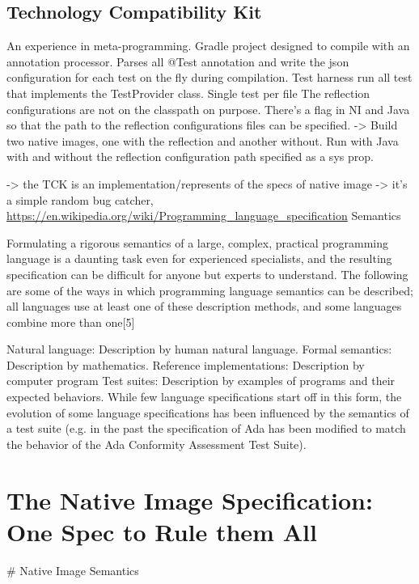 \section{Technology Compatibility Kit}
An experience in meta-programming. 
Gradle project designed to compile with an annotation processor. Parses all @Test annotation and write the json configuration for each test on the fly
during compilation.
Test harness run all test that implements the TestProvider class. Single test per file
The reflection configurations are not on the classpath on purpose. There's a flag in NI and Java so that the path to the reflection configurations files can be specified.
-> Build two native images, one with the reflection and another without. Run with Java with and without the reflection configuration path specified as a sys prop.

-> the TCK is an implementation/represents of the specs of native image
-> it's a simple random bug catcher, 
\url{https://en.wikipedia.org/wiki/Programming_language_specification}
Semantics

Formulating a rigorous semantics of a large, complex, practical programming language is a daunting task even for experienced specialists, and the resulting specification can be difficult for anyone but experts to understand. The following are some of the ways in which programming language semantics can be described; all languages use at least one of these description methods, and some languages combine more than one[5]

    Natural language: Description by human natural language.
    Formal semantics: Description by mathematics.
    Reference implementations: Description by computer program
    Test suites: Description by examples of programs and their expected behaviors. While few language specifications start off in this form, the evolution of some language specifications has been influenced by the semantics of a test suite (e.g. in the past the specification of Ada has been modified to match the behavior of the Ada Conformity Assessment Test Suite).

\chapter{The Native Image Specification: One Spec to Rule them All}\label{native_image_specs}
# Native Image Semantics


